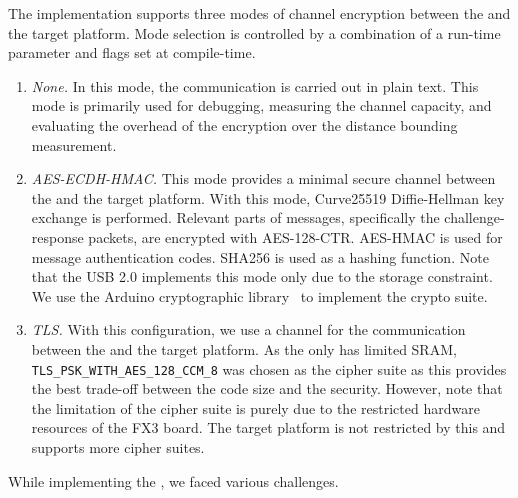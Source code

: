  The implementation supports three modes of channel encryption between the \device and the target platform. Mode selection is controlled by a combination of a run-time parameter and flags set at compile-time.

\begin{enumerate}
  \item \emph{None.} In this mode, the communication is carried out in plain text. This mode is primarily used for debugging, measuring the channel capacity, and evaluating the overhead of the encryption over the distance bounding measurement.
  
  \item \emph{AES-ECDH-HMAC.} This mode provides a minimal secure channel between the \device and the target platform. With this mode, Curve25519 Diffie-Hellman key exchange is performed. Relevant parts of messages, specifically the challenge-response packets, are encrypted with AES-128-CTR. AES-HMAC is used for message authentication codes. SHA256 is used as a hashing function. Note that the USB 2.0 implements this mode only due to the storage constraint. We use the Arduino cryptographic library~\cite{ardCrypto} to implement the crypto suite. 
  
  \item \emph{TLS.} With this configuration, we use a \tls channel for the communication between the \device and the target platform. As the \device only has limited SRAM, \texttt{TLS\_PSK\_WITH\_AES\_128\_CCM\_8} was chosen as the cipher suite as this provides the best trade-off between the code size and the security. However, note that the limitation of the cipher suite is purely due to the restricted hardware resources of the FX3 board. The target platform is not restricted by this and supports more cipher suites. 
\end{enumerate}


  
 While implementing the \device, we faced various challenges.

